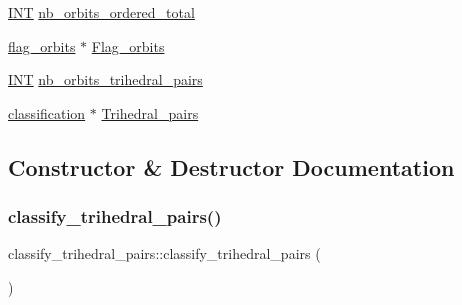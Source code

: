 \begin{DoxyCompactItemize}
\item 
\mbox{\hyperlink{galois_8h_a09fddde158a3a20bd2dcadb609de11dc}{I\+NT}} \mbox{\hyperlink{classclassify__trihedral__pairs_a2abb5057d30b17f2785e7d5585e60c18}{nb\+\_\+orbits\+\_\+ordered\+\_\+total}}
\item 
\mbox{\hyperlink{classflag__orbits}{flag\+\_\+orbits}} $\ast$ \mbox{\hyperlink{classclassify__trihedral__pairs_a5d53a821fb9d54bdd1ad5b1673d223c6}{Flag\+\_\+orbits}}
\item 
\mbox{\hyperlink{galois_8h_a09fddde158a3a20bd2dcadb609de11dc}{I\+NT}} \mbox{\hyperlink{classclassify__trihedral__pairs_a58b2bbfb4b47905c061ce8f6648a7052}{nb\+\_\+orbits\+\_\+trihedral\+\_\+pairs}}
\item 
\mbox{\hyperlink{classclassification}{classification}} $\ast$ \mbox{\hyperlink{classclassify__trihedral__pairs_a5908a2bdf051560d6b0990c07f1b2ceb}{Trihedral\+\_\+pairs}}
\end{DoxyCompactItemize}


\subsection{Constructor \& Destructor Documentation}
\mbox{\label{classclassify__trihedral__pairs_a841688b6e1756306ce583b177058911e}} 
\subsubsection{\texorpdfstring{classify\+\_\+trihedral\+\_\+pairs()}{classify\_trihedral\_pairs()}}
{\footnotesize\ttfamily classify\+\_\+trihedral\+\_\+pairs\+::classify\+\_\+trihedral\+\_\+pairs (\begin{DoxyParamCaption}{ }\end{DoxyParamCaption})}

\mbox{\label{classclassify__trihedral__pairs_a356342a8528414097f3bedbe4bef0212}} 
